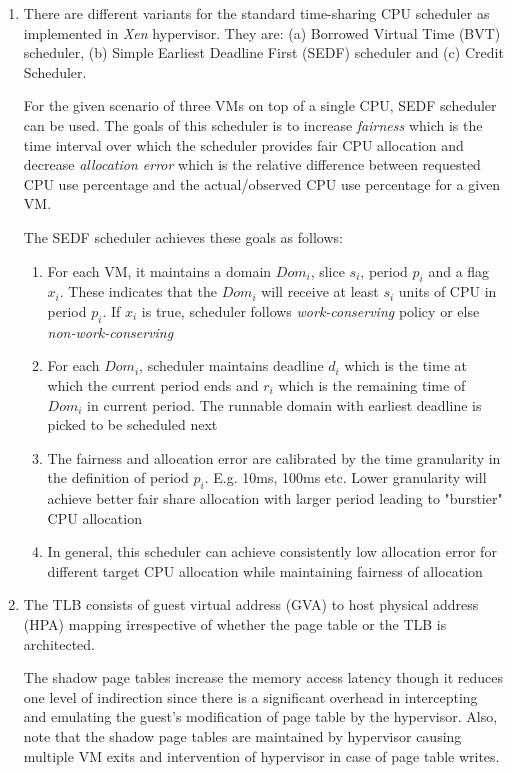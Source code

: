 \documentclass[11pt,a4paper,oneside]{article}
\begin{document}
\begin{enumerate}
		\item There are different variants for the standard time-sharing CPU scheduler as implemented in \emph{Xen} hypervisor. They are: (a) Borrowed Virtual Time (BVT) scheduler, (b) Simple Earliest Deadline First (SEDF) scheduler and (c) Credit Scheduler. 
		
		For the given scenario of three VMs on top of a single CPU, SEDF scheduler can be used. The goals of this scheduler is to increase \emph{fairness} which is the time interval over which the scheduler provides fair CPU allocation and decrease \emph{allocation error} which is the relative difference between requested CPU use percentage and the actual/observed CPU use percentage for a given VM.
		
		The SEDF scheduler achieves these goals as follows:
		\begin{enumerate}
			\item For each VM, it maintains a domain $Dom_i$, slice $s_i$, period $p_i$ and a flag $x_i$. These indicates that the $Dom_i$ will receive at least $s_i$ units of CPU in period $p_i$. If $x_i$ is true, scheduler follows \emph{work-conserving} policy or else \emph{non-work-conserving}
			\item For each $Dom_i$, scheduler maintains deadline $d_i$ which is the time at which the current period ends and $r_i$ which is the remaining time of $Dom_i$ in current period. The runnable domain with earliest deadline is picked to be scheduled next
			\item The fairness and allocation error are calibrated by the time granularity in the definition of period $p_i$. E.g. 10ms, 100ms etc. Lower granularity will achieve better fair share allocation with larger period leading to "burstier" CPU allocation
			\item In general, this scheduler can achieve consistently low allocation error for different target CPU allocation while maintaining fairness of allocation
		\end{enumerate}
 		\item The TLB consists of guest virtual address (GVA) to host physical address (HPA) mapping irrespective of whether the page table or the TLB is architected.
 		
 		The shadow page tables increase the memory access latency though it reduces one level of indirection since there is a significant overhead in intercepting and emulating the guest's modification of page table by the hypervisor. Also, note that the shadow page tables are maintained by hypervisor causing multiple VM exits and intervention of hypervisor in case of page table writes.
 		

\end{enumerate}
\end{document}
